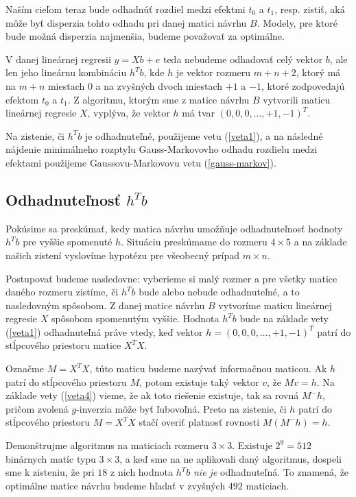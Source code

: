 Naším cieľom teraz bude odhadnúť rozdiel medzi efektmi $t_0$ a $t_1$, resp. zistiť, 
aká môže byť disperzia tohto odhadu pri danej matici návrhu $B$. 
Modely, pre ktoré bude možná disperzia najmenšia, budeme považovať za optimálne.

V danej lineárnej regresii $y = X b + e$ teda nebudeme odhadovať celý vektor $b$, 
ale len jeho lineárnu kombináciu $h^T b$, kde $h$ je vektor rozmeru $m + n + 2$, 
ktorý má na $m + n$ miestach $0$ a na zvyšných dvoch miestach $+1$ a $-1$, ktoré zodpovedajú efektom $t_0$ a $t_1$. 
Z algoritmu, ktorým sme z matice návrhu $B$ vytvorili maticu lineárnej regresie $X$, 
vyplýva, že vektor $h$ má tvar $(0, 0, 0, \ldots, +1, -1)^T$.

Na zistenie, či $h^T b$ je odhadnuteľné, použijeme vetu (\ref{veta1}), 
a na následné nájdenie minimálneho rozptylu Gauss-Markovovho odhadu rozdielu medzi efektami 
použijeme Gaussovu-Markovovu vetu (\ref{gauss-markov}).

\subsection{Odhadnuteľnosť $h^T b$}

Pokúsime sa preskúmať, kedy matica návrhu umožňuje odhadnuteľnosť hodnoty $h^T b$ pre vyššie spomenuté $h$. 
Situáciu preskúmame do rozmeru $4 \times 5$ a na základe našich zistení vyslovíme hypotézu pre všeobecný prípad $m \times n$.

Postupovať budeme nasledovne: vyberieme si malý rozmer a pre všetky matice daného rozmeru zistíme, 
či $h^T b$ bude alebo nebude odhadnuteľné, a to nasledovným spôsobom. 
Z danej matice návrhu $B$ vytvoríme maticu lineárnej regresie $X$ spôsobom spomenutým vyššie. 
Hodnota $h^T b$ bude na základe vety (\ref{veta1}) odhadnuteľná práve vtedy, 
keď vektor $h = (0, 0, 0, \ldots, +1, -1)^T$ patrí do stĺpcového priestoru matice $X^T X$.

Označme $M = X^T X$, túto maticu budeme nazývať informačnou maticou. 
Ak $h$ patrí do stĺpcového priestoru $M$, potom existuje taký vektor $v$, že $M v = h$. 
Na základe vety (\ref{veta4}) vieme, že ak toto riešenie existuje, tak sa rovná $M^- h$, pričom zvolená $g$-inverzia môže byť ľubovoľná.
Preto na zistenie, či $h$ patrí do stĺpcového priestoru $M = X^T X$ stačí overiť platnosť rovnosti $M(M^- h) = h$. 

Demonštrujme algoritmus na maticiach rozmeru $3 \times 3$. Existuje $2^9 = 512$ binárnych matíc typu $3 \times 3$, 
a keď sme na ne aplikovali daný algoritmus, dospeli sme k zisteniu, že pri $18$ z nich hodnota $h^T b$ \emph{nie je} odhadnuteľná.
To znamená, že optimálne matice návrhu budeme hľadať v zvyšných $492$ maticiach.

